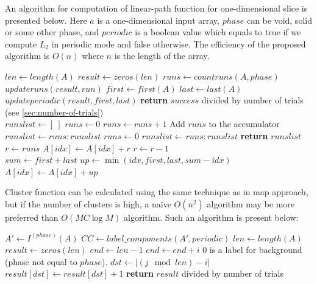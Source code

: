 \documentclass[reprint,amsmath,amssymb,aps,pre,showkeys,showpacs,nofootinbib]{revtex4-1}
\begin{document}
An algorithm for computation of linear-path function for one-dimensional slice
is presented below. Here $a$ is a one-dimensional input array, $phase$ can be
void, solid or some other phase, and $periodic$ is a boolean value which equals
to true if we compute $L_2$ in periodic mode and false otherwise. The efficiency
of the proposed algorithm is $O(n)$ where $n$ is the length of the array.
\begin{algorithmic}[1]
    \State $len \gets length(A)$
    \State $result \gets zeros(len)$
    \State $runs \gets countruns(A, phase)$
      \State $updateruns(result, run)$
    \EndFor
      \State $first \gets first(A)$
      \State $last \gets last(A)$
        \State $updateperiodic(result, first, last)$
      \EndIf
    \EndIf
    \State \textbf{return} $success$ divided by number of trials
    (see \cref{sec:number-of-trials})
  \EndProcedure
  \\
    \State $runslist \gets [\ ]$
    \State $runs \gets 0$
        \State $runs \gets runs + 1$
        \Comment Add $runs$ to the accumulator
        \State $runslist \gets runs:runslist$
        \State $runs \gets 0$
      \EndIf
    \EndFor
      \State $runslist \gets runs:runslist$
    \EndIf
    \State \textbf{return} $runslist$
  \EndProcedure
  \\
    \State $r \gets runs$
      \State $A[idx] \gets A[idx] + r$
      \State $r \gets r - 1$
    \EndFor
  \EndProcedure
  \\
    \State $sum \gets first + last$
      \State $up \gets \min(idx, first, last, sum - idx)$
      \State $A[idx] \gets A[idx] + up$
    \EndFor
  \EndProcedure
\end{algorithmic}

Cluster function can be calculated using the same technique as in map approach,
but if the number of clusters is high, a naïve $O(n^2)$ algorithm may be more
preferred than $O(MC \log M)$ algorithm. Such an algorithm is present below:
\begin{algorithmic}[1]
    \State $A' \gets I^{(phase)}(A)$
    \State $CC \gets label\_components(A', periodic)$
    \State $len \gets length(A)$
    \State $result \gets zeros(len)$
        \State $end \gets len-1$
          \State $end \gets end + i$
        \EndIf
            \Comment $0$ is a label for background (phase not equal to $phase$).
            \State $dst \gets |(j \mod len) - i|$
            \State $result[dst] \gets result[dst] + 1$
          \EndIf
        \EndFor
      \EndFor
    \EndFor
    \State \textbf{return} $result$ divided by number of trials
  \EndProcedure
\end{algorithmic}
\end{document}
